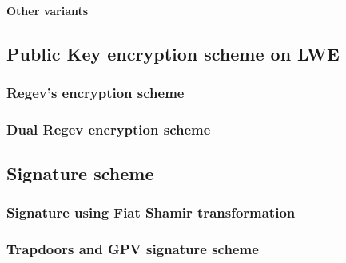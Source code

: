 

\paragraph{Other variants}


\subsection{Public Key encryption scheme on LWE}

\subsubsection{Regev's encryption scheme}

\subsubsection{Dual Regev encryption scheme}


\subsection{Signature scheme}

\subsubsection{Signature using Fiat Shamir transformation}

\subsubsection{Trapdoors and GPV signature scheme}